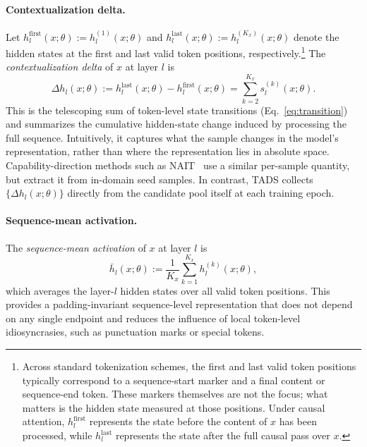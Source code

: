 \paragraph{Contextualization delta.}
Let
$h_l^{\mathrm{first}}(x;\theta) := h_l^{(1)}(x;\theta)$ and
$h_l^{\mathrm{last}}(x;\theta) := h_l^{(K_x)}(x;\theta)$ denote the
hidden states at the first and last valid token positions,
respectively.\footnote{Across standard tokenization schemes, the
first and last valid token positions typically correspond to a
sequence-start marker and a final content or sequence-end token.
These markers themselves are not the focus; what matters is the
hidden state measured at those positions. Under causal attention,
$h_l^{\mathrm{first}}$ represents the state before the content of
$x$ has been processed, while $h_l^{\mathrm{last}}$ represents the
state after the full causal pass over $x$.}
The \emph{contextualization delta} of $x$ at layer $l$ is
\begin{equation}
  \Delta h_l(x;\theta)
  :=
  h_l^{\mathrm{last}}(x;\theta) - h_l^{\mathrm{first}}(x;\theta)
  =
  \sum_{k=2}^{K_x} s_l^{(k)}(x;\theta).
  \label{eq:delta}
\end{equation}
This is the telescoping sum of token-level state transitions
(Eq.~\ref{eq:transition}) and summarizes the cumulative hidden-state
change induced by processing the full sequence. Intuitively, it
captures what the sample changes in the model's representation,
rather than where the representation lies in absolute space.
Capability-direction methods such as NAIT~\citep{nait2026} use a
similar per-sample quantity, but extract it from in-domain seed
samples. In contrast, \textsc{TADS} collects
$\{\Delta h_l(x;\theta)\}$ directly from the candidate pool itself
at each training epoch. 


  
\paragraph{Sequence-mean activation.}
The \emph{sequence-mean activation} of $x$ at layer $l$ is
\begin{equation}
  \bar h_l(x;\theta)
  :=
  \frac{1}{K_x}\sum_{k=1}^{K_x} h_l^{(k)}(x;\theta),
  \label{eq:meanact}
\end{equation}
which averages the layer-$l$ hidden states over all valid token
positions. This provides a padding-invariant sequence-level
representation that does not depend on any single endpoint and
reduces the influence of local token-level idiosyncrasies, such as
punctuation marks or special tokens.

